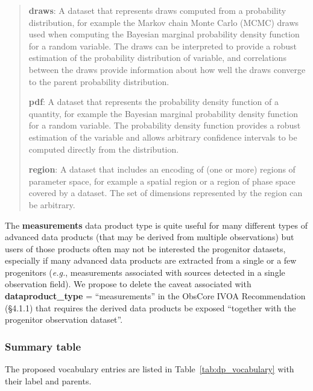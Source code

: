 \documentclass[11pt,a4paper]{ivoa}
\begin{document}
\begin{quote}
{\bf draws}:  A dataset that represents draws computed from a probability distribution, for example the Markov chain Monte Carlo (MCMC) draws used when computing the Bayesian marginal probability density function for a random variable.  The draws can be interpreted to provide a robust estimation of the probability distribution of variable, and correlations between the draws provide information about how well the draws converge to the parent probability distribution.

{\bf pdf}: A dataset that represents the probability density function of a quantity, for example the Bayesian marginal probability density function for a random variable.  The probability density function provides a robust estimation of the variable and allows arbitrary confidence intervals to be computed directly from the distribution.

{\bf region}: A dataset that includes an encoding of (one or more) regions of parameter space, for example a spatial region or a region of phase space covered by a dataset.  The set of dimensions represented by the region can be arbitrary.
\end{quote}

The {\bf measurements} data product type is quite useful for many different types of advanced data products (that may be derived from multiple observations) but users of those products often may not be interested the progenitor datasets, especially if many advanced data products are extracted from a single or a few progenitors ({\em e.g.\/}, measurements associated with sources detected in a single observation field). We propose to delete the caveat associated with {\bf dataproduct\_type} = ``measurements'' in the ObsCore IVOA Recommendation (\S4.1.1) that requires the derived data products be exposed ``together with the progenitor observation dataset''.

\newpage
\subsubsection{Summary table}

The proposed vocabulary entries are listed in Table~\ref{tab:dp_vocabulary} with their label and parents.
\end{document}
